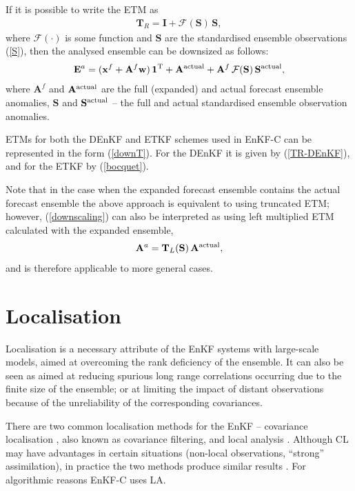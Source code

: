 \documentclass[11pt]{report}
\newcommand{\mb} {\mathbf}
\newcommand{\T}{^{\tiny \mathrm T}}
\newcommand*\suptxt[1]{^{\textnormal{#1}}}
\begin{document}
If it is possible to write the ETM as
\begin{align}
  \label{downT}
  \mb T_R = \mb I + \mathcal F(\mb S) \, \mb S,
\end{align}
where $\mathcal F(\cdot)$ is some function and $\mb S$ are the standardised ensemble observations (\ref{S}), then the analysed ensemble can be downsized as follows:
\begin{align}
  \label{downscaling}
  \mb E^{a} = (\mb x^f + \mb A^f \mb w) \, \mb 1\T + \mb A\suptxt{actual} + \mb A^f \, \mathcal F(\mb S) \, \mb S\suptxt{actual},
\end{align}
where $\mb A^f$ and $\mb A\suptxt{actual}$ are the full (expanded) and actual forecast ensemble anomalies, $\mb S$ and $\mb S\suptxt{actual}$ -- the full and actual standardised ensemble observation anomalies.

ETMs for both the DEnKF and ETKF schemes used in EnKF-C can be represented in the form (\ref{downT}).
For the DEnKF it is given by (\ref{TR-DEnKF}), and for the ETKF by (\ref{bocquet}).

Note that in the case when the expanded forecast ensemble contains the actual forecast ensemble the above approach is equivalent to using truncated ETM; however, (\ref{downscaling}) can also be interpreted as using left multiplied ETM calculated with the expanded ensemble,
\begin{align*}
  \mb A^a = \mb T_L(\mb S) \, \mb A\suptxt{actual},
\end{align*}
and is therefore applicable to more general cases.

\section{Localisation}

Localisation is a necessary attribute of the EnKF systems with large-scale models, aimed at overcoming the rank deficiency of the ensemble.
It can also be seen as aimed at reducing spurious long range correlations occurring due to the finite size of the ensemble; or at limiting the impact of distant observations because of the unreliability of the corresponding covariances.

There are two common localisation methods for the EnKF -- covariance localisation \citep[CL,][]{ham01b, hou01a}, also known as covariance filtering, and local analysis \citep[LA,][]{eve03a, ott03a}.
Although CL may have advantages in certain situations (non-local observations, ``strong'' assimilation), in practice the two methods produce similar results \citep{sak11a}.
For algorithmic reasons EnKF-C uses LA.
\end{document}
